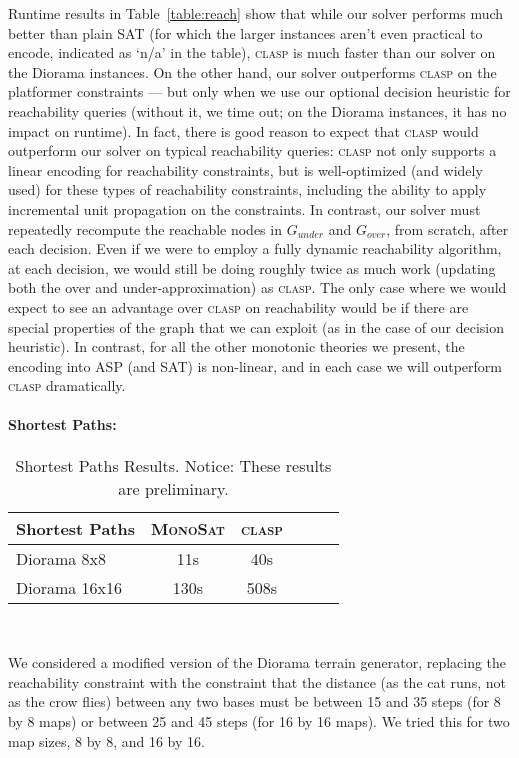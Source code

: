 \documentclass[runningheads]{llncs}
\newcommand{\comments}[1]{}
\newcommand{\algformat}[1]{\textsc{#1}\xspace}
\newcommand{\monosat}{\algformat{MonoSat}}
\newcommand{\clasp}{\algformat{clasp}}
\newcommand{\gunder}{G_{under}}
\newcommand{\gover}{G_{over}}
\begin{document}
Runtime results in 
Table~\ref{table:reach} show that while our solver performs
much better than plain SAT (for which the larger instances aren't
even practical to encode, indicated as `n/a' in the table),  \clasp is much faster than our solver on the
Diorama instances. On the other hand, our solver outperforms \clasp on
the platformer constraints --- but only when we use our optional decision
heuristic for reachability queries (without it, we time out; on the
Diorama instances, it has no impact on runtime). In fact, there is good
reason to expect that \clasp would outperform our solver on typical
reachability queries:  \clasp not only supports a linear encoding
for reachability constraints,
but is well-optimized (and widely used) for these types of reachability
constraints, including the ability
to apply incremental
unit propagation on the constraints. In contrast, our solver must
repeatedly recompute the reachable nodes in $\gunder$ and $\gover$, from
scratch, after each decision. Even if we were to employ a fully dynamic
reachability algorithm, at each decision, we would still be doing roughly twice as much work
(updating both the over and under-approximation)  as
\clasp{}. The only case where we would expect to see an advantage
over \clasp on reachability would be if there are special properties
of the graph  that we can exploit (as
in the case of our decision heuristic).
In contrast, for all the other monotonic theories we present,
the encoding into ASP (and SAT) is non-linear, and in each case we will outperform \clasp dramatically. 


\paragraph{\textbf{Shortest Paths:}}

\begin{wraptable}{R}{0.45\textwidth}

\centering
\begin{tabular}{ l c c c c c }
  Shortest Paths & \monosat &  \clasp  \\
  \hline
Diorama 8x8 & 11s & 40s  \\ Diorama 16x16 &  130s   &  508s \\ \hline  
\end{tabular}~~~~
\caption{Shortest Paths Results. \label{table:shortest}Notice: These results are preliminary.}\end{wraptable}

We considered a modified version of the Diorama terrain generator, replacing the reachability constraint with the constraint that the distance (as the cat runs, not as the crow flies) between any two bases must be between 15 and 35 steps (for 8 by 8 maps) or between 25 and 45 steps (for 16 by 16 maps). We tried this for two map sizes, 8 by 8, and 16 by 16. 
\comments{
Our second application is the chromatic maze generation problem from~\cite{smith2011answer}. This task involves assigning colors to a grid to form a `chromatic' maze, with a minimum start-to-finish path length of a certain size (for the 6x6 maze, the path must be at least 20 steps; for the 10x10 maze, at least 65 steps). 
}
\end{document}
